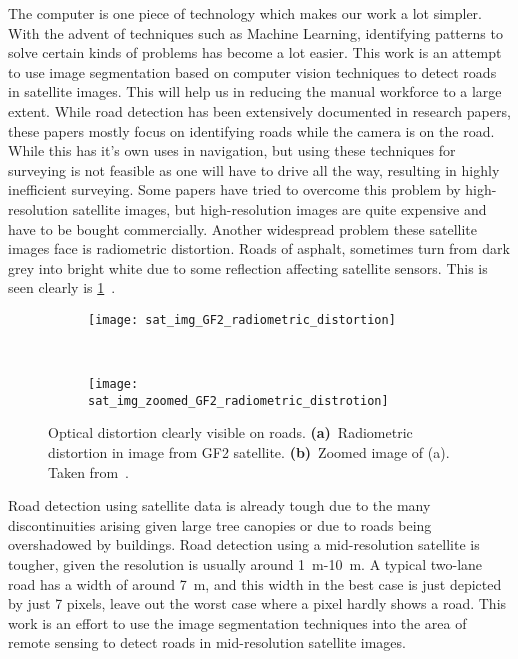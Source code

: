 The computer is one piece of technology which makes our work a lot simpler. With the advent of techniques such as Machine Learning, identifying patterns to solve certain kinds of problems has become a lot easier. This work is an attempt to use image segmentation based on computer vision techniques to detect roads in satellite images. This will help us in reducing the manual workforce to a large extent. While road detection has been extensively documented in research papers, these papers mostly focus on identifying roads while the camera is on the road. While this has it's own uses in navigation, but using these techniques for surveying is not feasible as one will have to drive all the way, resulting in highly inefficient surveying. Some papers have tried to overcome this problem by high-resolution satellite images, but high-resolution images are quite expensive and have to be bought commercially. Another widespread problem these satellite images face is radiometric distortion. Roads of asphalt, sometimes turn from dark grey into bright white due to some reflection affecting satellite sensors. This is seen clearly is \cref{fig:sat_img_radiometric_distortion}~\cite{GF2-imageCaseStudy}.

\begin{figure}[h!]
  \centering
  \begin{subfigure}{0.48\textwidth}
    \texttt{[image: sat\_img\_GF2\_radiometric\_distortion]}
    \caption{}
  \end{subfigure}~
  \begin{subfigure}{0.48\textwidth}
    \texttt{[image: sat\_img\_zoomed\_GF2\_radiometric\_distrotion]}
    \caption{}
  \end{subfigure}
  \caption[Optical distortion clearly visible on roads]{Optical distortion clearly visible on roads. \textbf{(a)}~Radiometric distortion in image from GF2 satellite. \textbf{(b)}~Zoomed image of (a). Taken from~\cite{GF2-imageCaseStudy}.}
  \label{fig:sat_img_radiometric_distortion}
\end{figure}

Road detection using satellite data is already tough due to the many discontinuities arising given large tree canopies or due to roads being overshadowed by buildings. Road detection using a mid-resolution satellite is tougher, given the resolution is usually around 1~m-10~m. A typical two-lane road has a width of around 7~m, and this width in the best case is just depicted by just 7 pixels, leave out the worst case where a pixel hardly shows a road. This work is an effort to use the image segmentation techniques into the area of remote sensing to detect roads in mid-resolution satellite images.